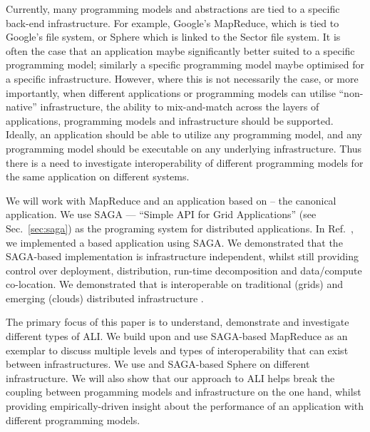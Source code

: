 \documentclass[3p,twocolumn]{elsarticle}
\begin{document}
Currently, many programming models and abstractions are tied to a
specific back-end infrastructure.  For example, Google's MapReduce,
which is tied to Google's file system, or Sphere\cite{sectorsphere09}
which is linked to the Sector file system.  It is often the case that
an application maybe significantly better suited to a specific
programming model; similarly a specific programming model maybe
optimised for a specific infrastructure. However, where this is not
necessarily the case, or more importantly, when different
applications or programming models can utilise ``non-native''
infrastructure, the ability to mix-and-match across the layers of
applications, programming models and infrastructure should be
supported.  Ideally, an application should be able to utilize any
programming model, and any programming model should be executable on
any underlying infrastructure.  Thus there is a need to investigate
interoperability of different programming models for the same
application on different systems.

We will
work with MapReduce and an application based on \mr -- the canonical
\wc application.  We use SAGA --- “Simple API for Grid Applications''
(see Sec.~\ref{sec:saga}) as the programing system for distributed
applications.  In Ref.~\cite{saga_ccgrid09}, we
implemented a \mr based \wc application using SAGA.  We
demonstrated that the SAGA-based implementation is infrastructure
independent, whilst still providing control over deployment,
distribution, run-time decomposition and data/compute co-location.  We
demonstrated that \sagamapreduce is interoperable on traditional
(grids) and emerging (clouds) distributed infrastructure
.

The primary focus of this paper is to understand, demonstrate and
investigate different types of ALI. We build upon and use SAGA-based
MapReduce as an exemplar to discuss multiple levels and types of
interoperability that can exist between infrastructures. We use
\sagamapreduce and SAGA-based Sphere on different infrastructure. We
will also show that our approach to ALI helps break the coupling
between progamming models and infrastructure on the one hand, whilst
providing empirically-driven insight about the performance of an
application with different programming models.
\end{document}
